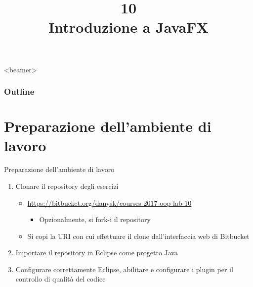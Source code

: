 \documentclass[presentation]{beamer}
\title[L10 -- JavaFX, Concurrency]{10\\Introduzione a JavaFX}
\begin{document}
\frame[label=coverpage]{\titlepage}

\begin{frame}<beamer>
 	\frametitle{Outline}
 	\tableofcontents[]
\end{frame}

\section{Preparazione dell'ambiente di lavoro}

\begin{frame}{Preparazione dell'ambiente di lavoro}
	\begin{enumerate}\itemsep20pt
		\item Clonare il repository degli esercizi
		\begin{itemize}
			\item \url{https://bitbucket.org/danysk/courses-2017-oop-lab-10}
		\begin{itemize}
		\item Opzionalmente, si fork-i il repository
		\end{itemize}
			\item Si copi la URI con cui effettuare il clone dall'interfaccia web di Bitbucket
		\end{itemize}
		\item Importare il repository in Eclipse come progetto Java
		\item Configurare correttamente Eclipse, abilitare e configurare i plugin per il controllo di qualità del codice
	\end{enumerate}
\end{frame}
\end{document}
